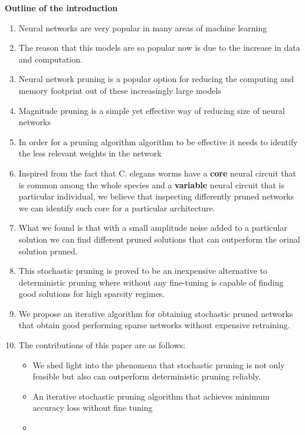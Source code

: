 \vspace{3cm}
\textbf{Outline of the  introduction}

\begin{enumerate}
    \item Neural networks are very popular in many areas of machine learning
    \item The reason that this models are so popular now is due to the increase
        in data and computation.
    \item Neural network pruning is a popular option for reducing the computing
        and memory footprint out of these increasingly large models
    \item Magnitude pruning is a simple yet effective way of reducing size of
        neural networks
    \item In order for a pruning algorithm algorithm to be effective it needs
        to identify the less relevant weights in the network
    \item Inspired from the fact that C. elegans worms have a \textbf{core}
        neural circuit that is common among the whole species and a \textbf{variable}
        neural circuit that is particular individual, we believe that
        inspecting differently pruned networks we can identify such core for a
        particular architecture.
    \item What we found is that with a small amplitude noise added to a
        particular solution we can find different pruned solutions that can
        outperform the orinal solution pruned.
    \item This stochastic pruning is proved to be an inexpensive alternative
        to deterministic pruning where without any fine-tuning is capable of
        finding good solutions for high sparsity regimes.
    \item We propose an iterative algorithm for obtaining stochastic pruned
        networks that obtain good performing sparse networks without expensive
        retraining.
        

    \item The contributions of this paper are as follows:
     \begin{itemize}
         \item We shed light into the phenomena that stochastic pruning is not
             only feasible but also can outperform deterministic pruning
             reliably.
        \item An iterative stochastic pruning algorithm that achieves minimum
            accuracy loss without fine tuning
        \item {}

     \end{itemize}

\end{enumerate}

